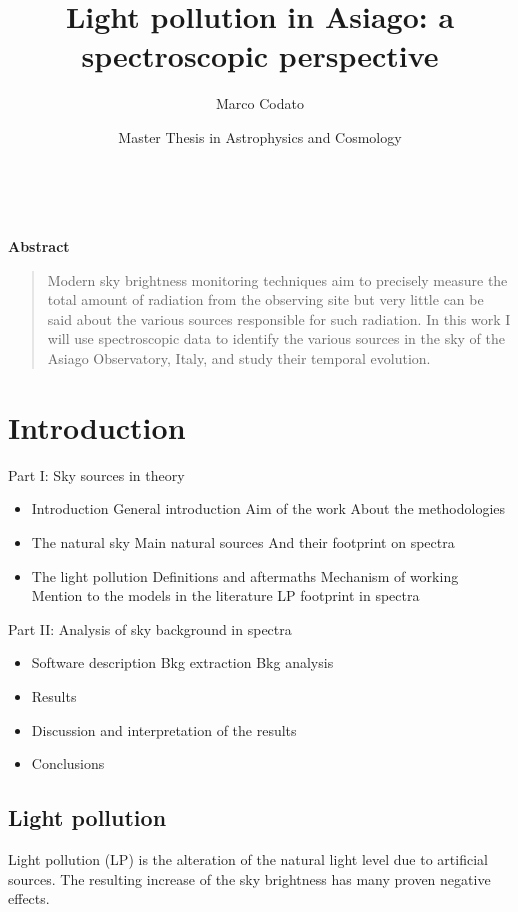 \documentclass[a4paper, titlepage, 10pt]{book}
\title{Light pollution in Asiago: a spectroscopic perspective}
\author{Marco Codato}
\date{Master Thesis in Astrophysics and Cosmology}
\newenvironment{abstract}{%
	\newpage\thispagestyle{empty}\vspace*{3\baselineskip}
	\begin{center}\Large\textbf{Abstract}\end{center}%
	\begin{quotation}%
	}{\end{quotation}\clearpage}
\begin{document}
\maketitle

\thispagestyle{empty}
\
\begin{abstract}
	Modern sky brightness monitoring techniques aim to precisely measure the total amount of radiation from the observing site but very little can be said about the various sources responsible for such radiation.
	In this work I will use spectroscopic data to identify the various sources in the sky of the Asiago Observatory, Italy, and study their temporal evolution.
\end{abstract}

\clearpage

\tableofcontents

\chapter{Introduction}
Part I: Sky sources in theory
\begin{itemize}
	\item Introduction
		\subitem General introduction
		\subitem Aim of the work
		\subitem About the methodologies
	\item The natural sky
		\subitem Main natural sources
		\subitem And their footprint on spectra
	\item The light pollution
		\subitem Definitions and aftermaths
		\subitem Mechanism of working
		\subitem Mention to the models in the literature
		\subitem LP footprint in spectra
\end{itemize}
Part II: Analysis of sky background in spectra
\begin{itemize}
	\item Software description
		\subitem Bkg extraction
		\subitem Bkg analysis
	\item Results
	\item Discussion and interpretation of the results
	\item Conclusions
\end{itemize}

\section{Light pollution}
Light pollution (LP) is the alteration of the natural light level due to artificial sources. The resulting increase of the sky brightness has many proven negative effects.
\end{document}
